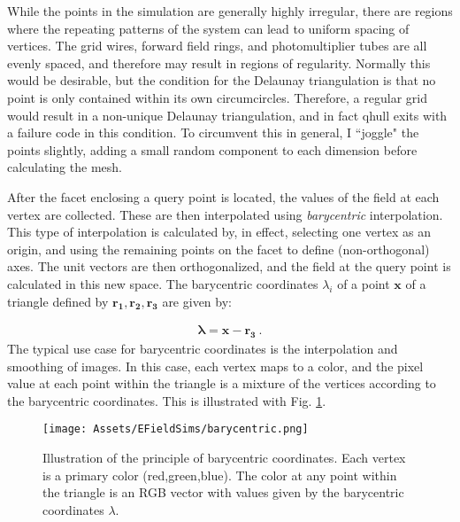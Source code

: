 While the points in the simulation are generally highly irregular, there are regions where the repeating patterns of the system can lead to uniform spacing of vertices.
The grid wires, forward field rings, and photomultiplier tubes are all evenly spaced, and therefore may result in regions of regularity.
Normally this would be desirable, but the condition for the Delaunay triangulation is that no point is only contained within its own circumcircles.
Therefore, a regular grid would result in a non-unique Delaunay triangulation, and in fact qhull exits with a failure code in this condition.
To circumvent this in general, I ``joggle" the points slightly, adding a small random component to each dimension before calculating the mesh.


After the facet enclosing a query point is located, the values of the field at each vertex are collected.
These are then interpolated using \textit{barycentric} interpolation.
This type of interpolation is calculated by, in effect, selecting one vertex as an origin, and using the remaining points on the facet to define (non-orthogonal) axes.
The unit vectors are then orthogonalized, and the field at the query point is calculated in this new space.
The barycentric coordinates $\lambda_i$ of a point $\mathbf{x}$ of a triangle defined by $\mathbf{r_1},\mathbf{r_2},\mathbf{r_3}$ are given by:

\begin{align}
    [(\mathbf{r_1} - \mathbf{r_3}),(\mathbf{r_2} - \mathbf{r_3}) ] \mathbf{\lambda} =  \mathbf{x} - \mathbf{r_3}~.
    \label{eq:barycentric}
\end{align}
The typical use case for barycentric coordinates is the interpolation and smoothing of images.
In this case, each vertex maps to a color, and the pixel value at each point within the triangle is a mixture of the vertices according to the barycentric coordinates. 
This is illustrated with Fig. \ref{fig:barycentric}.

\begin{figure}
    \centering
    \texttt{[image: Assets/EFieldSims/barycentric.png]}
    \caption[Illustration of the principle of barycentric coordinates. 
    Each vertex is a primary color (red,green,blue).]%
    {Illustration of the principle of barycentric coordinates. 
    Each vertex is a primary color (red,green,blue).
    The color at any point within the triangle is an RGB vector with values given by the barycentric coordinates $\lambda$.}
    \label{fig:barycentric}
\end{figure}
